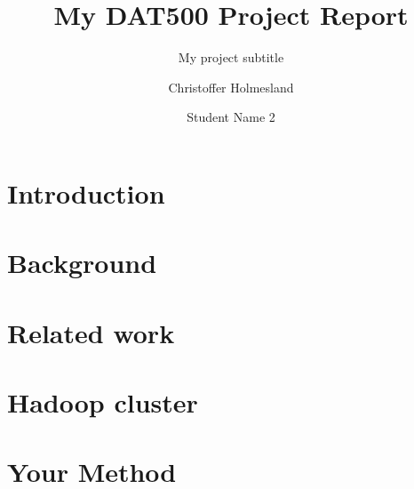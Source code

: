 \documentclass[sigconf]{acmart}
\begin{document}
\title{My DAT500 Project Report}
\subtitle{My project subtitle}

\author{Christoffer Holmesland}

\author{Student Name 2}




\begin{abstract}

\end{abstract}


\maketitle


\section{Introduction}
\label{sec:introduction}


\section{Background}
\label{sec:background}


\section{Related work}
\label{sec:relatedwork}


\section{Hadoop cluster}
\label{sec:hadoop}


\section{Your Method}
\label{sec:method}

\end{document}
